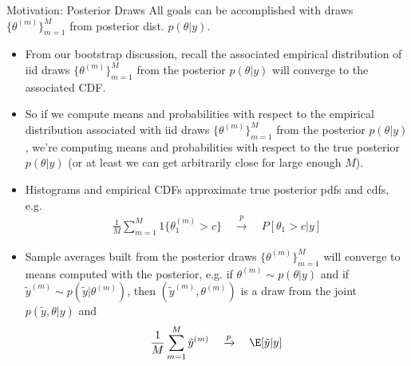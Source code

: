 \documentclass[aspectratio=169, handout]{beamer}
\newcommand{\pto}{\xrightarrow{p}}
\begin{document}
{\footnotesize
\begin{frame}{Motivation: Posterior Draws}
All goals can be accomplished with \alert{draws}
$\{\theta^{(m)}\}_{m=1}^M$ from posterior dist.
$p(\theta|y)$.
\begin{itemize}
  \item From our bootstrap discussion, recall the associated
    empirical distribution of iid draws $\{\theta^{(m)}\}_{m=1}^M$ from
    the posterior $p(\theta|y)$ will \alert{converge} to the associated
    CDF.

  \item
    So if we compute means and probabilities with respect to the
    empirical distribution associated with  iid draws
    $\{\theta^{(m)}\}_{m=1}^M$ from the posterior $p(\theta|y)$,
    we're computing means and probabilities with respect to
    the true posterior $p(\theta|y)$ (or at least we can get arbitrarily
    close for large enough $M$).

  \item
    Histograms and empirical CDFs approximate true
    posterior pdfs and cdfs, e.g.
    \begin{align*}
      \frac{1}{M}
      \sum_{m=1}^M
      1\{\theta_1^{(m)}>c\}
      \quad
      \pto
      \quad
      P[\theta_1>c|y]
    \end{align*}

  \vspace{-7pt}

  \item \alert{Sample averages} built from the posterior
    draws $\{\theta^{(m)}\}_{m=1}^M$ will converge to
    \alert{means} computed with the posterior, e.g.
    if $\theta^{(m)}\sim p(\theta|y)$ and
    if $\tilde{y}^{(m)}\sim p(\tilde{y}|\theta^{(m)})$,
    then $(\tilde{y}^{(m)},\theta^{(m)})$ is a draw from the joint
    $p(\tilde{y},\theta|y)$ and
    \begin{align*}
      \frac{1}{M}
      \sum_{m=1}^M
      \tilde{y}^{(m)}
      \quad\pto\quad
      \E[\tilde{y}|y]
    \end{align*}
\end{itemize}
\end{frame}
}
\end{document}
